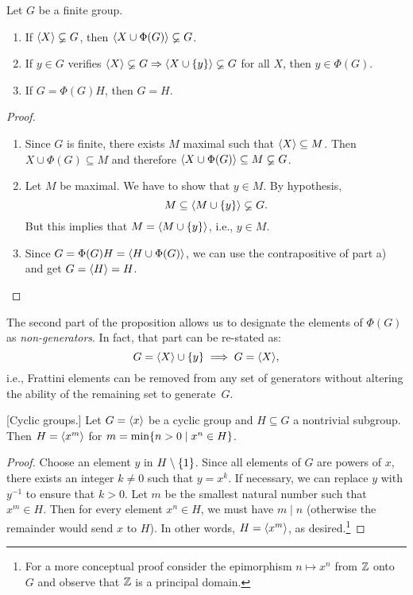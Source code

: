 \begin{prop}\label{frattini} Let\/ $G$ be a finite group.
    \begin{enumerate}[\rm a)]
        \item If $\langle X\rangle\varsubsetneq G$, then $\langle X\cup\Phi(G)\rangle\varsubsetneq G$.
        \item If\/ $y\in G$ verifies $\langle X\rangle\varsubsetneq G\Rightarrow\langle X\cup\{y\}\rangle\varsubsetneq G$ for all $X$, then $y\in\Phi(G)$.
        \item If $G=\Phi(G)H$, then $G=H$.
    \end{enumerate}
\end{prop}

\begin{proof}${}$
\begin{enumerate}[\rm a)]
    \item Since $G$ is finite, there exists $M$ maximal such that $\langle X\rangle\subseteq M$. Then $X\cup\Phi(G)\subseteq M$ and therefore $\langle X\cup\Phi(G)\rangle\subseteq M\varsubsetneq G$.
    \item Let $M$ be maximal. We have to show that $y\in M$. By hypothesis,
    $$
        M\subseteq\langle M\cup\{y\}\rangle\varsubsetneq G.
    $$
    But this implies that $M=\langle M\cup\{y\}\rangle$, i.e., $y\in M$.
    \item Since $G=\Phi(G)H=\langle H\cup\Phi(G)\rangle$, we can use the contrapositive of part a) and get $G=\langle H\rangle= H$.
\end{enumerate}
 \end{proof}

\begin{rem}\label{non-generators}
    The second part of the proposition allows us to designate the elements of\/ $\Phi(G)$ as \textsl{non-generators}. In fact, that part can be re-stated as:
    $$
        G=\langle X\rangle\cup\{y\}\implies G=\langle X\rangle,
    $$
    i.e., Frattini elements can be removed from any set of generators without altering the ability of the remaining set to generate\/~$G$.
\end{rem}

\begin{prop}{\rm[Cyclic groups.]}
    Let\/ $G=\langle x\rangle$ be a cyclic group and $H\subseteq G$ a nontrivial subgroup. Then $H=\langle x^m\rangle$ for $m=\min\{n>0\mid x^n\in H\}$.
\end{prop}

\begin{proof} Choose an element $y$ in $H\setminus\{1\}$. Since all elements of $G$ are powers of $x$, there exists an integer $k\ne0$ such that $y=x^k$. If necessary, we can replace $y$ with $y^{-1}$ to ensure that $k>0$. Let $m$ be the smallest natural number such that $x^m\in H$. Then for every element $x^n\in H$, we must have $m\mid n$ (otherwise the remainder would send $x$ to $H$). In other words, $H=\langle x^m\rangle$, as desired.\footnote{For a more conceptual proof consider the epimorphism $n\mapsto x^n$ from $\mathbb{Z}$ onto $G$ and observe that $\mathbb{Z}$ is a principal domain.}  \end{proof} 

